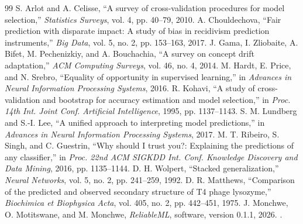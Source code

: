 \documentclass[conference]{IEEEtran}
\begin{document}
\begin{thebibliography}{99}
 S. Arlot and A. Celisse, ``A survey of cross-validation procedures for model selection,'' \emph{Statistics Surveys}, vol. 4, pp. 40--79, 2010.
 A. Chouldechova, ``Fair prediction with disparate impact: A study of bias in recidivism prediction instruments,'' \emph{Big Data}, vol. 5, no. 2, pp. 153--163, 2017.
 J. Gama, I. Zliobaite, A. Bifet, M. Pechenizkiy, and A. Bouchachia, ``A survey on concept drift adaptation,'' \emph{ACM Computing Surveys}, vol. 46, no. 4, 2014.
 M. Hardt, E. Price, and N. Srebro, ``Equality of opportunity in supervised learning,'' in \emph{Advances in Neural Information Processing Systems}, 2016.
 R. Kohavi, ``A study of cross-validation and bootstrap for accuracy estimation and model selection,'' in \emph{Proc. 14th Int. Joint Conf. Artificial Intelligence}, 1995, pp. 1137--1143.
 S. M. Lundberg and S.-I. Lee, ``A unified approach to interpreting model predictions,'' in \emph{Advances in Neural Information Processing Systems}, 2017.
 M. T. Ribeiro, S. Singh, and C. Guestrin, ``Why should I trust you?: Explaining the predictions of any classifier,'' in \emph{Proc. 22nd ACM SIGKDD Int. Conf. Knowledge Discovery and Data Mining}, 2016, pp. 1135--1144.
 D. H. Wolpert, ``Stacked generalization,'' \emph{Neural Networks}, vol. 5, no. 2, pp. 241--259, 1992.
 D. R. Matthews, ``Comparison of the predicted and observed secondary structure of T4 phage lysozyme,'' \emph{Biochimica et Biophysica Acta}, vol. 405, no. 2, pp. 442--451, 1975.
 J. Monchwe, O. Motitswane, and M. Monchwe, \emph{ReliableML}, software, version 0.1.1, 2026. \projecturl.
\end{thebibliography}
\end{document}
